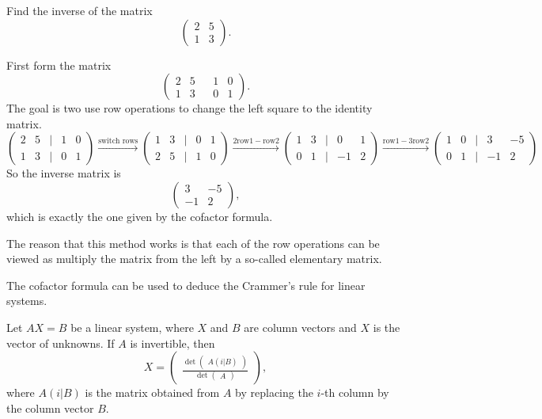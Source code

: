 \begin{example}
  Find the inverse of the matrix
  \[
    \begin{pmatrix}
    2 & 5 \\
    1 & 3
  \end{pmatrix}.
  \]
\end{example}
\begin{solution}
  First form the matrix 
  \[
    \begin{pmatrix}
      2 & 5 &  & 1 & 0\\
      1 & 3 &  & 0 & 1
    \end{pmatrix}.
  \]
  The goal is two use row operations to change the left square to the identity matrix.
  \[
    \begin{pmatrix}
      2 & 5 & | & 1 & 0\\
      1 & 3 & | & 0 & 1
    \end{pmatrix}
    \overset{\text{switch rows}}{\rightarrow} \begin{pmatrix}
      1 & 3 & | & 0 & 1\\
      2 & 5 & | & 1 & 0
    \end{pmatrix}
    \overset{2\text{row} 1 - \text{row} 2}{\rightarrow} \begin{pmatrix}
      1 & 3 & | & 0 & 1\\
      0 & 1 & | & -1 & 2
    \end{pmatrix}
    \overset{\text{row} 1 - 3\text{row} 2}{\rightarrow} \begin{pmatrix}
      1 & 0 & | & 3 & -5\\
      0 & 1 & | & -1 & 2
    \end{pmatrix}
  \]
So the inverse matrix is
\[\begin{pmatrix}
  3 & -5\\
  -1 & 2
\end{pmatrix},\]
which is exactly the one given by the cofactor formula.
\end{solution}

The reason that this method works is that each of the row operations can be viewed as multiply the matrix from the left by a so-called elementary matrix.

The cofactor formula can be used to deduce the Crammer's rule for linear systems.

\begin{theorem}
  Let $AX=B$ be a linear system, where $X$ and $B$ are column vectors and $X$ is the vector of unknowns. If $A$ is invertible, then
  \[X=\begin{pmatrix}
    \frac{\det\begin{pmatrix}
      A(i|B)
    \end{pmatrix}}{\det\begin{pmatrix}
      A
    \end{pmatrix}}
  \end{pmatrix},
  \]
  where $A(i|B)$ is the matrix obtained from $A$ by replacing the $i$-th column by the column vector $B$.
\end{theorem}

